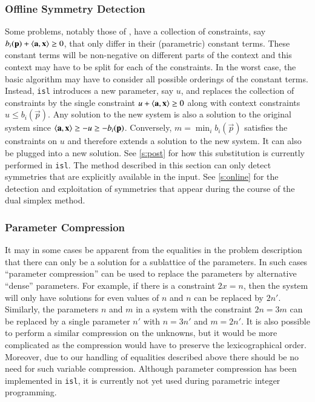 \subsubsection{Offline Symmetry Detection}\label{s:offline}

Some problems, notably those of \textcite{Bygde2010licentiate},
have a collection of constraints, say
$b_i(\vec p) + \sp {\vec a} {\vec x} \ge 0$,
that only differ in their (parametric) constant terms.
These constant terms will be non-negative on different parts
of the context and this context may have to be split for each
of the constraints.  In the worst case, the basic algorithm may
have to consider all possible orderings of the constant terms.
Instead, {\tt isl} introduces a new parameter, say $u$, and
replaces the collection of constraints by the single
constraint $u + \sp {\vec a} {\vec x} \ge 0$ along with
context constraints $u \le b_i(\vec p)$.
Any solution to the new system is also a solution
to the original system since
$\sp {\vec a} {\vec x} \ge -u \ge -b_i(\vec p)$.
Conversely, $m = \min_i b_i(\vec p)$ satisfies the constraints
on $u$ and therefore extends a solution to the new system.
It can also be plugged into a new solution.
See \autoref{s:post} for how this substitution is currently performed
in {\tt isl}.
The method described in this section can only detect symmetries
that are explicitly available in the input.
See \autoref{s:online} for the detection
and exploitation of symmetries that appear during the course of
the dual simplex method.

\subsubsection{Parameter Compression}\label{s:compression}

It may in some cases be apparent from the equalities in the problem
description that there can only be a solution for a sublattice
of the parameters.  In such cases ``parameter compression''
\parencite{Meister2004PhD,Meister2008} can be used to replace
the parameters by alternative ``dense'' parameters.
For example, if there is a constraint $2x = n$, then the system
will only have solutions for even values of $n$ and $n$ can be replaced
by $2n'$.  Similarly, the parameters $n$ and $m$ in a system with
the constraint $2n = 3m$ can be replaced by a single parameter $n'$
with $n=3n'$ and $m=2n'$.
It is also possible to perform a similar compression on the unknowns,
but it would be more complicated as the compression would have to
preserve the lexicographical order.  Moreover, due to our handling
of equalities described above there should be
no need for such variable compression.
Although parameter compression has been implemented in {\tt isl},
it is currently not yet used during parametric integer programming.

